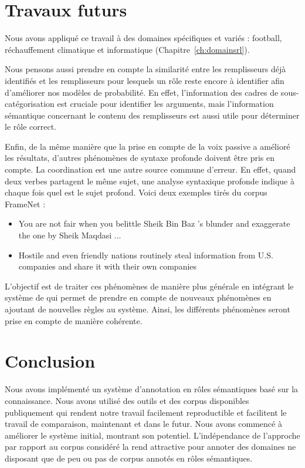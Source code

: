 \section{Travaux futurs}

Nous avons appliqué ce travail à des domaines spécifiques et variés : football,
réchauffement climatique et informatique (Chapitre~\ref{ch:domainsrl}).

Nous pensons aussi prendre en compte la similarité entre les remplisseurs déjà
identifiés et les remplisseurs pour lesquels un rôle reste encore à identifier
afin d'améliorer nos modèles de probabilité. En effet, l'information des cadres
de sous-catégorisation est cruciale pour identifier les arguments, mais
l'information sémantique concernant le contenu des remplisseurs est aussi utile
pour déterminer le rôle correct.

Enfin, de la même manière que la prise en compte de la voix passive a amélioré
les résultats, d'autres phénomènes de syntaxe profonde doivent être pris en
compte. La coordination est une autre source commune d'erreur. En effet, quand
deux verbes partagent le même sujet, une analyse syntaxique profonde indique à
chaque fois quel est le sujet profond. Voici deux exemples tirés du corpus
FrameNet :

\begin{itemize}
    \item You are not fair when you belittle Sheik Bin Baz 's blunder and
          exaggerate the one by Sheik Maqdasi ...
    \item Hostile and even friendly nations routinely steal information from
          U.S. companies and share it with their own companies
\end{itemize}

L'objectif est de traiter ces phénomènes de manière plus générale en intégrant
le système de \cite{ribeyre2013systeme} qui permet de prendre en compte de
nouveaux phénomènes en ajoutant de nouvelles règles au système. Ainsi, les
différents phénomènes seront prise en compte de manière cohérente.

\section{Conclusion}

Nous avons implémenté un système d'annotation en rôles sémantiques basé sur la
connaissance. Nous avons utilisé des outils et des corpus disponibles
publiquement qui rendent notre travail facilement reproductible et facilitent
le travail de comparaison, maintenant et dans le futur. Nous avons commencé à
améliorer le système initial, montrant son potentiel. L'indépendance de
l'approche par rapport au corpus considéré la rend attractive pour annoter des
domaines ne disposant que de peu ou pas de corpus annotés en rôles sémantiques.
